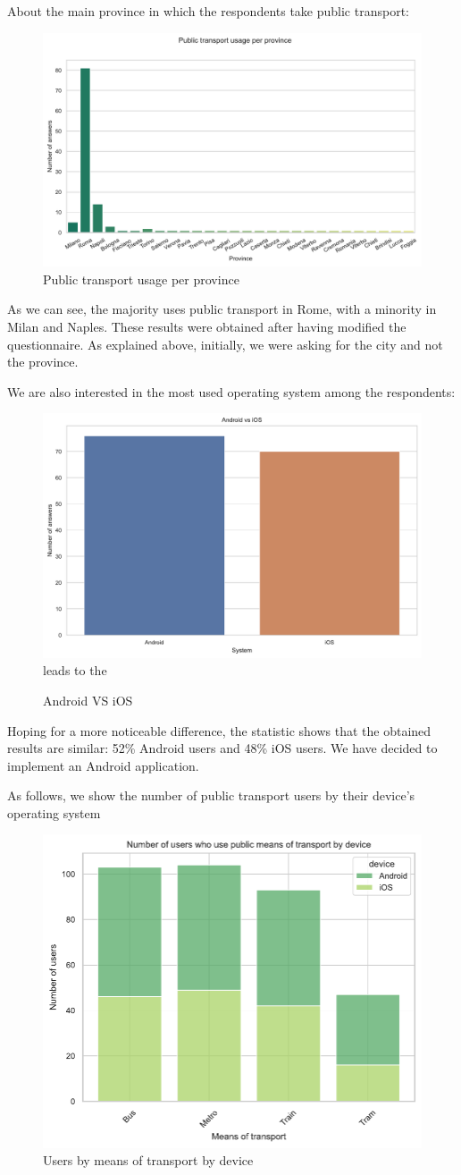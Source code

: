 \documentclass[a4paper, 11pt]{report}
\begin{document}
About the main province in which the respondents take public transport:
\begin{figure}[H]
	\centering
	\includegraphics[width=.8\textwidth]{img/analysis/public_transport_usage_per_province.pdf}
	\caption{Public transport usage per province}
\end{figure}
As we can see, the majority uses public transport in Rome, with a minority in Milan and Naples. These results were obtained after having modified
the questionnaire. As explained above, initially, we were asking for the city and not the province.

We are also interested in the most used operating system among the respondents:
\begin{figure}[H]
	\centering
	\includegraphics[width=.5\textwidth]{img/analysis/android_v_ios.pdf}leads to the
	\caption{Android VS iOS}
\end{figure}

Hoping for a more noticeable difference, the statistic shows that the obtained results are similar: 52\% Android users and 48\% iOS users.
We have decided to implement an Android application.

As follows, we show the number of public transport users by their device's operating system
\begin{figure}[H]
	\centering
	\includegraphics[width=.5\textwidth]{img/analysis/users_by_means_of_transport_by_device.pdf}
	\caption{Users by means of transport by device}
\end{figure}
\end{document}
